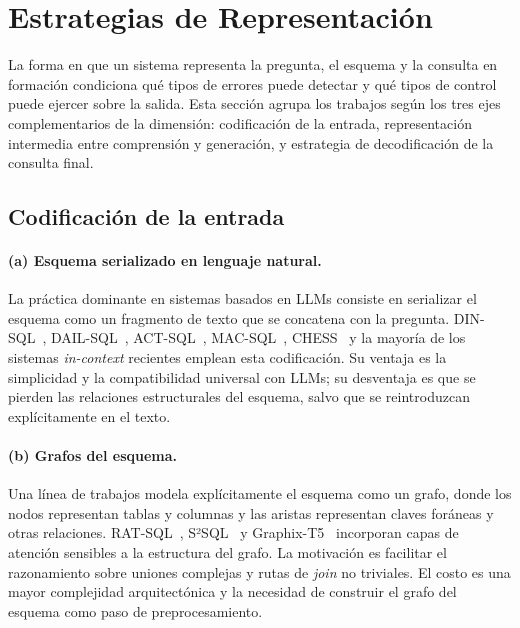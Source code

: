 \section{Estrategias de Representación}
\label{sec:sota-d3-representacion}

La forma en que un sistema representa la pregunta, el esquema y la
consulta en formación condiciona qué tipos de errores puede detectar y
qué tipos de control puede ejercer sobre la salida. Esta sección agrupa
los trabajos según los tres ejes complementarios de la dimensión:
codificación de la entrada, representación intermedia entre comprensión y
generación, y estrategia de decodificación de la consulta final.

\subsection{Codificación de la entrada}
\label{subsec:sota-d3a-encoding}

\paragraph{(a) Esquema serializado en lenguaje natural.} La práctica
dominante en sistemas basados en \acp{LLM} consiste en serializar el
esquema como un fragmento de texto que se concatena con la pregunta.
DIN-SQL~\cite{DIN-SQL2023}, DAIL-SQL~\cite{DAIL-SQL2023},
ACT-SQL~\cite{ACT-SQL2023}, MAC-SQL~\cite{MAC-SQL2023},
CHESS~\cite{CHESS2024} y la mayoría de los sistemas \emph{in-context}
recientes emplean esta codificación. Su ventaja es la simplicidad y la
compatibilidad universal con \acp{LLM}; su desventaja es que se pierden
las relaciones estructurales del esquema, salvo que se reintroduzcan
explícitamente en el texto.

\paragraph{(b) Grafos del esquema.} Una línea de trabajos modela
explícitamente el esquema como un grafo, donde los nodos representan
tablas y columnas y las aristas representan claves foráneas y otras
relaciones. RAT-SQL~\cite{RAT-SQL2021}, S²SQL~\cite{S2SQL2022} y
Graphix-T5~\cite{Graphix-T52022} incorporan capas de atención sensibles
a la estructura del grafo. La motivación es facilitar el razonamiento
sobre uniones complejas y rutas de \emph{join} no triviales. El costo
es una mayor complejidad arquitectónica y la necesidad de construir el
grafo del esquema como paso de preprocesamiento.

